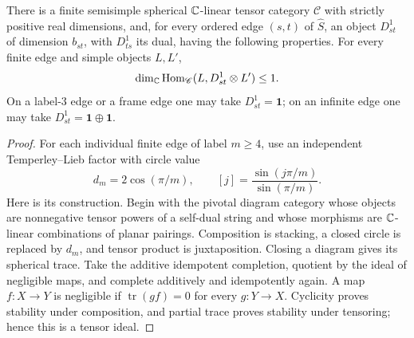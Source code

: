 \begin{proposition}
\label{prop:fusion-construction}
There is a finite semisimple spherical $\mathbb C$-linear tensor category
$\mathscr C$ with strictly positive real dimensions, and, for every
ordered edge $(s,t)$ of $\widehat S$, an object $D^1_{st}$ of dimension
$b_{st}$, with $D^1_{ts}$ its dual, having the following properties.
For every finite edge and simple objects $L,L'$,
\[
 \dim_\mathbb C\operatorname{Hom}_{\mathscr C}(L,D^1_{st}\otimes L')\leq1.
\]
On a label-$3$ edge or a frame edge one may take $D^1_{st}=\mathbf1$;
on an infinite edge one may take $D^1_{st}=\mathbf1\oplus\mathbf1$.
\end{proposition}

\begin{proof}
For each individual finite edge of label $m\geq4$, use an independent
Temperley--Lieb factor with circle value
\[
 d_m=2\cos(\pi/m),\qquad
 [j]=\frac{\sin(j\pi/m)}{\sin(\pi/m)}.
\]
Here is its construction. Begin with the pivotal diagram category whose
objects are nonnegative tensor powers of a self-dual string and whose
morphisms are $\mathbb C$-linear combinations of planar pairings. Composition
is stacking, a closed circle is replaced by $d_m$, and tensor product
is juxtaposition. Closing a diagram gives its spherical trace. Take the
additive idempotent completion, quotient by the ideal of negligible
maps, and complete additively and idempotently again. A map $f:X\to Y$
is negligible if $\operatorname{tr}(gf)=0$ for every $g:Y\to X$.
Cyclicity proves stability under composition, and partial trace proves
stability under tensoring; hence this is a tensor ideal.


\end{proof}
